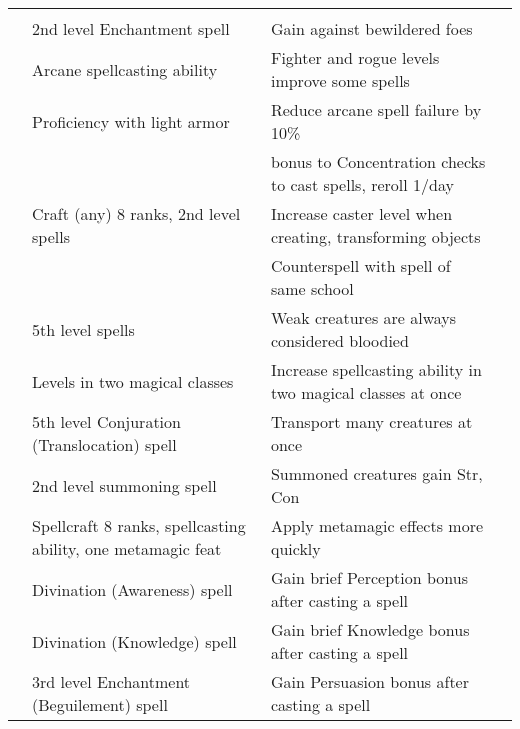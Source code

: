 {\begin{longtabu}{>{\lcol}p{10em} >{\lcol}p{15em} >{\lcol}X >{\lcol}p{3em}}
\midrule
{} &  &  &  \\
 & 2nd level Enchantment spell & Gain  against bewildered foes &  \\
 & Arcane spellcasting ability & Fighter and rogue levels improve some spells &  \\
 & Proficiency with light armor & Reduce arcane spell failure by 10\% &  \\
 & \x &   bonus to Concentration checks to cast spells, reroll 1/day &  \\
 & Craft (any) 8 ranks, 2nd level spells & Increase caster level when creating, transforming objects &  \\
 & \x &  Counterspell with spell of same school &  \\
 & 5th level spells & Weak creatures are always considered bloodied &  \\
 & Levels in two magical classes & Increase spellcasting ability in two magical classes at once &  \\
 & 5th level Conjuration (Translocation) spell & Transport many creatures at once &  \\
 & 2nd level summoning spell & Summoned creatures gain  Str,  Con &  \\
 & Spellcraft 8 ranks, spellcasting ability, one metamagic feat & Apply metamagic effects more quickly &  \\
 & Divination (Awareness) spell & Gain brief Perception bonus after casting a spell &  \\
 & Divination (Knowledge) spell & Gain brief Knowledge bonus after casting a spell &  \\
 & 3rd level Enchantment (Beguilement) spell & Gain Persuasion bonus after casting a spell &  \\

\end{longtabu}}

